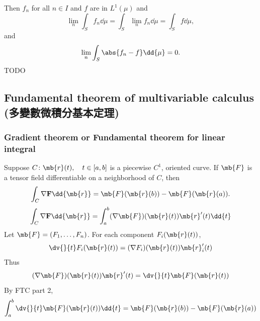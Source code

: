\documentclass[a4paper,12pt]{report}
\begin{document}
\begin{itemize}
\begin{itemize}
Then $f_n$ for all $n\in I$ and $f$ are in $L^1(\mu)$ and
\[\lim_n\int_Sf_n\dd{\mu}=\int_S\lim_nf_n\dd{\mu}=\int_Sf\dd{\mu},\]
and
\[\lim_n\int_S\abs{f_n-f}\dd{\mu}=0.\]
\bpr
TODO
\epr
\subsection{Fundamental theorem of multivariable calculus (多變數微積分基本定理)}
\subsubsection{Gradient theorem or Fundamental theorem for linear integral}
Suppose $C\colon\mb{r}(t),\quad t\in[a,b]$ is a piecewise $C^1$, oriented curve. If $\mb{F}$ is a tensor field differentiable on a neighborhood of $C$, then
\[\int_C\nabla\mathbf{F}\dd{\mb{r}}=\mb{F}(\mb{r}(b))-\mb{F}(\mb{r}(a)).\]
\bpr
\[\int_C\nabla\mathbf{F}\dd{\mb{r}}=\int_a^b(\nabla\mb{F})(\mb{r}(t))\mb{r}'(t)\dd{t}\]
Let $\mb{F}=(F_1,\ldots,F_n)$. For each component $F_i(\mb{r}(t))$,
\[\dv{}{t}F_i(\mb{r}(t))=(\nabla F_i)(\mb{r}(t))\mb{r}_i'(t)\]
Thus
\[(\nabla\mb{F})(\mb{r}(t))\mb{r}'(t)=\dv{}{t}\mb{F}(\mb{r}(t))\]
By FTC part 2,
\[\int_a^b\dv{}{t}\mb{F}(\mb{r}(t))\dd{t}=\mb{F}(\mb{r}(b))-\mb{F}(\mb{r}(a))\]
\epr

\end{itemize}
\end{itemize}
\end{document}
